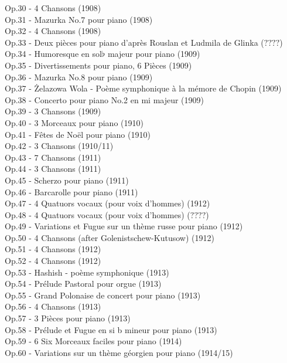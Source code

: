 Op.30 - 4 Chansons (1908)\\
Op.31 - Mazurka No.7 pour piano (1908)\\
Op.32 - 4 Chansons (1908)\\
Op.33 - Deux pièces pour piano d'après Rouslan et Ludmila de Glinka ($????$)\\
Op.34 - Humoresque en sol$\flat$ majeur pour piano (1909)\\
Op.35 - Divertissements pour piano, 6 Pièces (1909)\\
Op.36 - Mazurka No.8 pour piano (1909)\\
Op.37 - Żelazowa Wola - Poème symphonique à la mémore de Chopin (1909)\\
Op.38 - Concerto pour piano No.2 en mi majeur (1909)\\
Op.39 - 3 Chansons (1909)\\
Op.40 - 3 Morceaux pour piano (1910)\\
Op.41 - Fêtes de Noël pour piano (1910)\\
Op.42 - 3 Chansons (1910/11)\\
Op.43 - 7 Chansons (1911)\\
Op.44 - 3 Chansons (1911)\\
Op.45 - Scherzo pour piano (1911)\\
Op.46 - Barcarolle pour piano (1911)\\
Op.47 - 4 Quatuors vocaux (pour voix d'hommes) (1912)\\
Op.48 - 4 Quatuors vocaux (pour voix d'hommes) ($????$)\\
Op.49 - Variations et Fugue sur un thème russe pour piano (1912)\\
Op.50 - 4 Chansons (after Golenistschew-Kutusow) (1912)\\
Op.51 - 4 Chansons (1912)\\
Op.52 - 4 Chansons (1912)\\
Op.53 - Hashish - poème symphonique (1913)\\
Op.54 - Prélude Pastoral pour orgue (1913)\\
Op.55 - Grand Polonaise de concert pour piano (1913)\\
Op.56 - 4 Chansons (1913)\\
Op.57 - 3 Pièces pour piano (1913)\\
Op.58 - Prélude et Fugue en si b mineur pour piano (1913)\\
Op.59 - 6 Six Morceaux faciles pour piano (1914)\\
Op.60 - Variations sur un thème géorgien pour piano (1914/15)\\
